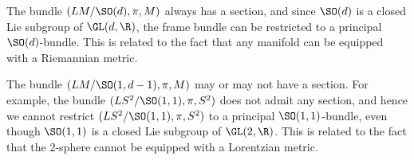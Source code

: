 \be
\ben[label=\roman*)]
\item The bundle $(LM/\SO(d),\pi,M)$ always has a section, and since $\SO(d)$ is a closed Lie subgroup of $\GL(d,\R)$, the frame bundle can be restricted to a principal $\SO(d)$-bundle. This is related to the fact that any manifold can be equipped with a Riemannian metric.   
\item The bundle $(LM/\SO(1,d-1),\pi,M)$ may or may not have a section.  For example, the bundle $(LS^2/\SO(1,1),\pi,S^2)$ does not admit any section, and hence we cannot restrict $(LS^2/\SO(1,1),\pi,S^2)$ to a principal $\SO(1,1)$-bundle, even though $\SO(1,1)$ is a closed Lie subgroup of $\GL(2,\R)$. This is related to the fact that the $2$-sphere cannot be equipped with a Lorentzian metric.
\een
\ee

















